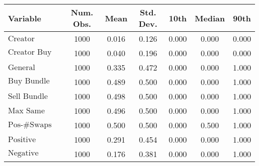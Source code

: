 \begin{tabular}{lcccccc}
\hline
Variable & Num. Obs. & Mean & Std. Dev. & 10th & Median & 90th \\
\hline
$\text{Creator Launch Bundle}$ & 1000 & 0.016 & 0.126 & 0.000 & 0.000 & 0.000 \\
$\text{Creator Buy Bundle}$ & 1000 & 0.040 & 0.196 & 0.000 & 0.000 & 0.000 \\
$\text{General Launch Bundle}$ & 1000 & 0.335 & 0.472 & 0.000 & 0.000 & 1.000 \\
$\text{Buy Bundle}$ & 1000 & 0.489 & 0.500 & 0.000 & 0.000 & 1.000 \\
$\text{Sell Bundle}$ & 1000 & 0.498 & 0.500 & 0.000 & 0.000 & 1.000 \\
$\text{Max Same Txn}$ & 1000 & 0.496 & 0.500 & 0.000 & 0.000 & 1.000 \\
$\text{Pos-\#Swaps Ratio}$ & 1000 & 0.500 & 0.500 & 0.000 & 0.500 & 1.000 \\
$\text{Positive Comment Bot}$ & 1000 & 0.291 & 0.454 & 0.000 & 0.000 & 1.000 \\
$\text{Negative Comment Bot}$ & 1000 & 0.176 & 0.381 & 0.000 & 0.000 & 1.000 \\
\hline
\end{tabular}
